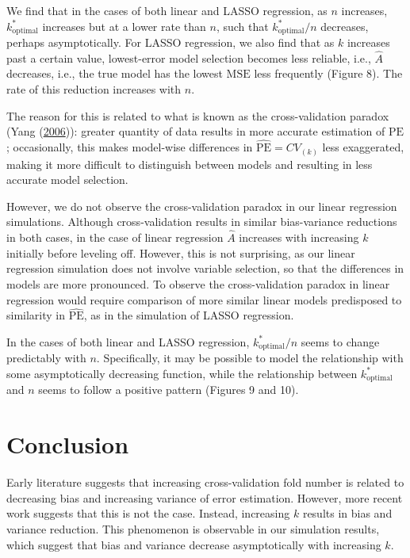\documentclass[
  12pt,
]{article}
\begin{document}
We find that in the cases of both linear and LASSO regression, as \(n\)
increases, \(k_\mathrm{optimal}^*\) increases but at a lower rate than
\(n\), such that \(k_\mathrm{optimal}^*/n\) decreases, perhaps
asymptotically. For LASSO regression, we also find that as \(k\)
increases past a certain value, lowest-error model selection becomes
less reliable, i.e., \(\hat{A}\) decreases, i.e., the true model has the
lowest \(\mathrm{MSE}\) less frequently (Figure 8). The rate of this
reduction increases with \(n\).

The reason for this is related to what is known as the cross-validation
paradox (Yang (\protect\hyperlink{ref-Yang2006}{2006})): greater
quantity of data results in more accurate estimation of \(\mathrm{PE}\);
occasionally, this makes model-wise differences in
\(\mathrm{\widehat{PE}} = CV_{(k)}\) less exaggerated, making it more
difficult to distinguish between models and resulting in less accurate
model selection.

However, we do not observe the cross-validation paradox in our linear
regression simulations. Although cross-validation results in similar
bias-variance reductions in both cases, in the case of linear regression
\(\hat{A}\) increases with increasing \(k\) initially before leveling
off. However, this is not surprising, as our linear regression
simulation does not involve variable selection, so that the differences
in models are more pronounced. To observe the cross-validation paradox
in linear regression would require comparison of more similar linear
models predisposed to similarity in \(\widehat{\mathrm{PE}}\), as in the
simulation of LASSO regression.

In the cases of both linear and LASSO regression,
\(k_\mathrm{optimal}^*/n\) seems to change predictably with \(n\).
Specifically, it may be possible to model the relationship with some
asymptotically decreasing function, while the relationship between
\(k_\mathrm{optimal}^*\) and \(n\) seems to follow a positive pattern
(Figures 9 and 10).

\hypertarget{conclusion}{%
\section{Conclusion}\label{conclusion}}

Early literature suggests that increasing cross-validation fold number
is related to decreasing bias and increasing variance of error
estimation. However, more recent work suggests that this is not the
case. Instead, increasing \(k\) results in bias and variance reduction.
This phenomenon is observable in our simulation results, which suggest
that bias and variance decrease asymptotically with increasing \(k\).
\end{document}
